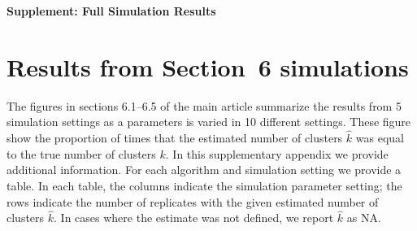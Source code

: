 \documentclass[11pt]{article}
\begin{document}
\begin{center}\textbf{\LARGE Supplement: Full Simulation Results}\\
\end{center}

\section*{Results from Section~6 simulations}

The figures in sections 6.1--6.5 of the main article summarize the results
from 5 simulation settings as a parameters is varied in 10 different settings.
These figure show the proportion of times that the estimated number of
clusters $\hat k$ was equal to the true number of clusters $k$. In this
supplementary appendix we provide additional information. For each algorithm
and simulation setting we provide a table. In each table, the columns indicate
the simulation parameter setting; the rows indicate the number of replicates
with the given estimated number of clusters $\hat k$. In cases where the
estimate was not defined, we report $\hat k$ as NA.
\end{document}
